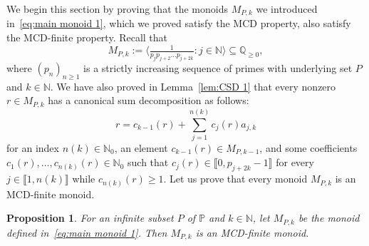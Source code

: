 \documentclass[10pt]{amsart}
\newtheorem{proposition}[theorem]{Proposition}
\theoremstyle{definition}
\theoremstyle{remark}
\numberwithin{equation}{section}
\newcommand{\nn}{\mathbb{N}}
\newcommand{\pp}{\mathbb{P}}
\newcommand{\qq}{\mathbb{Q}}
\providecommand\ldb{\llbracket}
\providecommand\rdb{\rrbracket}
\begin{document}
We begin this section by proving that the monoids $M_{P,k}$ we introduced in~\eqref{eq:main monoid 1}, which we proved satisfy the MCD property, also satisfy the MCD-finite property. Recall that
\[
  M_{P,k} := \Big\langle \tfrac{1}{p_j p_{j+2} \dots p_{j+2k}} : j \in \nn \Big\rangle \subseteq \qq_{\ge 0},
\]
where $(p_n)_{n \ge 1}$ is a strictly increasing sequence of primes with underlying set $P$ and $k \in \nn$. We have also proved in Lemma~\ref{lem:CSD 1} that every nonzero $r \in M_{P,k}$ has a canonical sum decomposition as follows:
\[
  r = c_{k-1}(r) + \sum_{j=1}^{n(k)} c_j(r) a_{j,k}
\]
for an index $n(k) \in \nn_0$, an element $c_{k-1}(r) \in M_{P,k-1}$, and some coefficients $c_1(r), \dots, c_{n(k)}(r) \in \nn_0$ such that $c_j(r) \in \ldb 0, p_{j+2k} - 1 \rdb$ for every $j \in \ldb 1,n(k) \rdb$ while $c_{n(k)}(r) \ge 1$. Let us prove that every monoid $M_{P,k}$ is an MCD-finite monoid.

\begin{proposition} \label{prop:MPk-is-MCD-finite}
  For an infinite subset $P$ of $\pp$ and $k \in \nn$, let $M_{P,k}$ be the monoid defined in~\eqref{eq:main monoid 1}. Then $M_{P,k}$ is an MCD-finite monoid.
\end{proposition}
\end{document}
